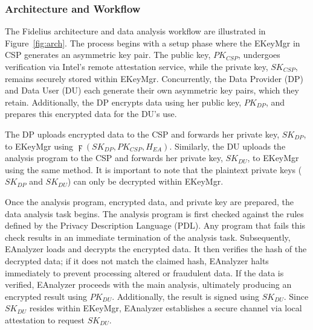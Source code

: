\subsubsection{Architecture and Workflow}

The Fidelius architecture and data analysis workflow are illustrated in Figure~\ref{fig:arch}. 
The process begins with a setup phase where the EKeyMgr in CSP generates an asymmetric key pair. The public key, $PK_{CSP}$, undergoes verification via Intel's remote attestation service, while the private key, $SK_{CSP}$, remains securely stored within EKeyMgr. Concurrently, the Data Provider (DP) and Data User (DU) each generate their own asymmetric key pairs, which they retain. Additionally, the DP encrypts data using her public key, $PK_{DP}$, and prepares this encrypted data for the DU's use.

The DP uploads encrypted data to the CSP and forwards her private key, $SK_{DP}$, to EKeyMgr using $\digamma(SK_{DP}, PK_{CSP}, H_{EA})$. Similarly, the DU uploads the analysis program to the CSP and forwards her private key, $SK_{DU}$, to EKeyMgr using the same method. It is important to note that the plaintext private keys ($SK_{DP}$ and $SK_{DU}$) can only be decrypted within EKeyMgr.

Once the analysis program, encrypted data, and private key are prepared, the data analysis task begins. The analysis program is first checked against the rules defined by the Privacy Description Language (PDL). Any program that fails this check results in an immediate termination of the analysis task. Subsequently, EAnalyzer loads and decrypts the encrypted data. It then verifies the hash of the decrypted data; if it does not match the claimed hash, EAnalyzer halts immediately to prevent processing altered or fraudulent data. If the data is verified, EAnalyzer proceeds with the main analysis, ultimately producing an encrypted result using $PK_{DU}$. Additionally, the result is signed using $SK_{DU}$. Since $SK_{DU}$ resides within EKeyMgr, EAnalyzer establishes a secure channel via local attestation to request $SK_{DU}$.


